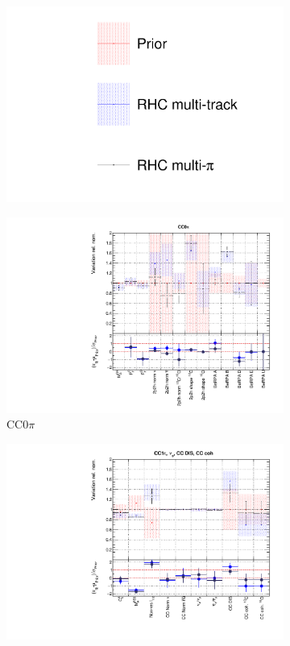 \begin{figure}[t]
\centering
\begin{subfigure}{0.95\textwidth}
  \centering
  \includegraphics[width=0.25\linewidth]{figs/rhcmpdat28_leg}	
\end{subfigure}
\begin{subfigure}{0.49\textwidth}
  \centering
  \includegraphics[width=0.95\linewidth]{figs/rhcmpdatxsec28_1}
  \caption{CC0$\pi$}
\end{subfigure}
\begin{subfigure}{0.49\textwidth}
  \centering
  \includegraphics[width=0.95\linewidth]{figs/rhcmpdatxsec28_2}

\end{subfigure}
\end{figure}
